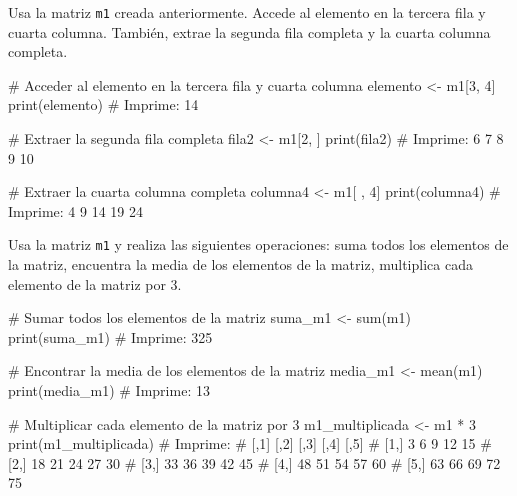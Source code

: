\documentclass[
  letterpaper,
]{scrbook}
\newenvironment{Shaded}{\begin{snugshade}}{\end{snugshade}}
\newcommand{\CommentTok}[1]{\textcolor[rgb]{0.37,0.37,0.37}{#1}}
\newcommand{\DecValTok}[1]{\textcolor[rgb]{0.68,0.00,0.00}{#1}}
\newcommand{\FunctionTok}[1]{\textcolor[rgb]{0.28,0.35,0.67}{#1}}
\newcommand{\NormalTok}[1]{\textcolor[rgb]{0.00,0.23,0.31}{#1}}
\newcommand{\OtherTok}[1]{\textcolor[rgb]{0.00,0.23,0.31}{#1}}
\newcommand{\SpecialCharTok}[1]{\textcolor[rgb]{0.37,0.37,0.37}{#1}}
\begin{document}
Usa la matriz \texttt{m1} creada anteriormente. Accede al elemento en la
tercera fila y cuarta columna. También, extrae la segunda fila completa
y la cuarta columna completa.

\begin{Shaded}
\begin{Highlighting}[]
\CommentTok{\# Acceder al elemento en la tercera fila y cuarta columna}
\NormalTok{elemento }\OtherTok{\textless{}{-}}\NormalTok{ m1[}\DecValTok{3}\NormalTok{, }\DecValTok{4}\NormalTok{]}
\FunctionTok{print}\NormalTok{(elemento)}
\CommentTok{\# Imprime: 14}

\CommentTok{\# Extraer la segunda fila completa}
\NormalTok{fila2 }\OtherTok{\textless{}{-}}\NormalTok{ m1[}\DecValTok{2}\NormalTok{, ]}
\FunctionTok{print}\NormalTok{(fila2)}
\CommentTok{\# Imprime: 6 7 8 9 10}

\CommentTok{\# Extraer la cuarta columna completa}
\NormalTok{columna4 }\OtherTok{\textless{}{-}}\NormalTok{ m1[ , }\DecValTok{4}\NormalTok{]}
\FunctionTok{print}\NormalTok{(columna4)}
\CommentTok{\# Imprime: 4 9 14 19 24}
\end{Highlighting}
\end{Shaded}

Usa la matriz \texttt{m1} y realiza las siguientes operaciones: suma
todos los elementos de la matriz, encuentra la media de los elementos de
la matriz, multiplica cada elemento de la matriz por 3.

\begin{Shaded}
\begin{Highlighting}[]
\CommentTok{\# Sumar todos los elementos de la matriz}
\NormalTok{suma\_m1 }\OtherTok{\textless{}{-}} \FunctionTok{sum}\NormalTok{(m1)}
\FunctionTok{print}\NormalTok{(suma\_m1)}
\CommentTok{\# Imprime: 325}

\CommentTok{\# Encontrar la media de los elementos de la matriz}
\NormalTok{media\_m1 }\OtherTok{\textless{}{-}} \FunctionTok{mean}\NormalTok{(m1)}
\FunctionTok{print}\NormalTok{(media\_m1)}
\CommentTok{\# Imprime: 13}

\CommentTok{\# Multiplicar cada elemento de la matriz por 3}
\NormalTok{m1\_multiplicada }\OtherTok{\textless{}{-}}\NormalTok{ m1 }\SpecialCharTok{*} \DecValTok{3}
\FunctionTok{print}\NormalTok{(m1\_multiplicada)}
\CommentTok{\# Imprime:}
\CommentTok{\#      [,1] [,2] [,3] [,4] [,5]}
\CommentTok{\# [1,]    3    6    9   12   15}
\CommentTok{\# [2,]   18   21   24   27   30}
\CommentTok{\# [3,]   33   36   39   42   45}
\CommentTok{\# [4,]   48   51   54   57   60}
\CommentTok{\# [5,]   63   66   69   72   75}
\end{Highlighting}
\end{Shaded}
\end{document}
